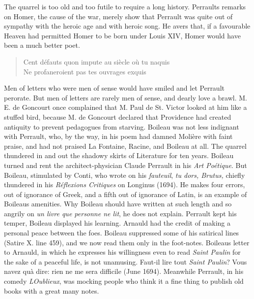 \documentclass[14pt,a4paper]{memoir}
\begin{document}
The quarrel is too old and too futile to require a long history.
Perrault\textquotesingle s remarks on Homer, the cause of the war,
merely show that Perrault was quite out of sympathy with the heroic age
and with heroic song. He avers that, if a favourable Heaven had
permitted Homer to be born under Louis XIV, Homer would have been a much
better poet.

\begin{verse}
\small
\textquotesingle Cent défauts qu\textquotesingle on impute au siècle où
tu naquis\\
Ne profaneroient pas tes ouvrages exquis

\end{verse}

Men of letters who were men of sense would have smiled and let Perrault
perorate. But men of letters are rarely men of sense, and dearly love a
brawl. M. E. de Goncourt once complained that M. Paul de St. Victor
looked at him \textquotesingle like a stuffed bird,\textquotesingle{}
because M. de Goncourt declared that Providence had created antiquity to
prevent pedagogues from starving. Boileau was not less indignant with
Perrault, who, by the way, in his poem had damned Molière with faint
praise, and had not praised La Fontaine, Racine, and Boileau at all. The
quarrel \textquotesingle thundered in and out the shadowy
skirts\textquotesingle{} of Literature for ten years. Boileau turned and
rent the architect-physician Claude Perrault in his \emph{Art Poétique}.
But Boileau, stimulated by Conti, who wrote on his \emph{fauteuil},
\textquotesingle{}\emph{tu dors, Brutus,}\textquotesingle{} chiefly
thundered in his \emph{Réflexions Critiques} on Longinus (1694).
\textquotesingle He makes four errors, out of ignorance of Greek, and a
fifth out of ignorance of Latin,\textquotesingle{} is an example of
Boileau\textquotesingle s amenities. Why Boileau should have written at
such length and so angrily on \emph{un livre que personne ne lit}, he
does not explain. Perrault kept his temper, Boileau displayed his
learning. Arnauld had the credit of making a personal peace between the
foes. Boileau suppressed some of his satirical lines (Satire X. line
459), and we now read them only in the foot-notes.
Boileau\textquotesingle s letter to Arnauld, in which he expresses his
willingness even to read \emph{Saint Paulin} for the sake of a peaceful
life, is not unamusing. \textquotesingle Faut-il lire tout \emph{Saint
Paulin}? Vous n\textquotesingle avez qu\textquotesingle à dire: rien ne
me sera difficile\textquotesingle{} (June 1694). Meanwhile Perrault, in
his comedy \emph{L\textquotesingle Oublieux}, was mocking people who
think it a fine thing \textquotesingle to publish old books with a great
many
notes\textquotesingle{}.
\end{document}

